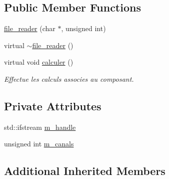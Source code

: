 \subsection*{Public Member Functions}
\begin{DoxyCompactItemize}
\item 
\hyperlink{classfile__reader_ad044fe1536ebee72e77fdd2973300dda}{file\-\_\-reader} (char $\ast$, unsigned int)
\item 
virtual \hyperlink{classfile__reader_a86aa8bf64bad02300e177401f8da6aee}{$\sim$file\-\_\-reader} ()
\item 
virtual void \hyperlink{classfile__reader_ac63890e9fbb85cda005efbce47f83648}{calculer} ()
\begin{DoxyCompactList}\small\item\em Effectue les calculs associes au composant. \end{DoxyCompactList}\end{DoxyCompactItemize}
\subsection*{Private Attributes}
\begin{DoxyCompactItemize}
\item 
std\-::ifstream \hyperlink{classfile__reader_aa7f6d7d6b00fe7e0524db94b2a279c8c}{m\-\_\-handle}
\item 
unsigned int \hyperlink{classfile__reader_a3dfaa67bb8ea591695eb1eecfdea4cde}{m\-\_\-canals}
\end{DoxyCompactItemize}
\subsection*{Additional Inherited Members}


